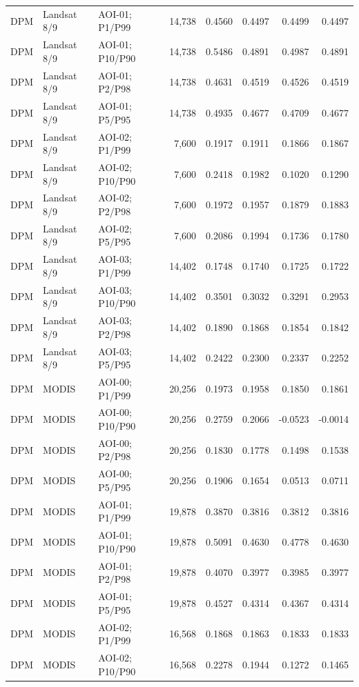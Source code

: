\begin{landscape}
\begin{longtable}{lllrrrrr}
DPM & Landsat 8/9 & AOI-01; P1/P99 & 14,738 & 0.4560 & 0.4497 & 0.4499 & 0.4497 \\
DPM & Landsat 8/9 & AOI-01; P10/P90 & 14,738 & 0.5486 & 0.4891 & 0.4987 & 0.4891 \\
DPM & Landsat 8/9 & AOI-01; P2/P98 & 14,738 & 0.4631 & 0.4519 & 0.4526 & 0.4519 \\
DPM & Landsat 8/9 & AOI-01; P5/P95 & 14,738 & 0.4935 & 0.4677 & 0.4709 & 0.4677 \\
DPM & Landsat 8/9 & AOI-02; P1/P99 & 7,600 & 0.1917 & 0.1911 & 0.1866 & 0.1867 \\
DPM & Landsat 8/9 & AOI-02; P10/P90 & 7,600 & 0.2418 & 0.1982 & 0.1020 & 0.1290 \\
DPM & Landsat 8/9 & AOI-02; P2/P98 & 7,600 & 0.1972 & 0.1957 & 0.1879 & 0.1883 \\
DPM & Landsat 8/9 & AOI-02; P5/P95 & 7,600 & 0.2086 & 0.1994 & 0.1736 & 0.1780 \\
DPM & Landsat 8/9 & AOI-03; P1/P99 & 14,402 & 0.1748 & 0.1740 & 0.1725 & 0.1722 \\
DPM & Landsat 8/9 & AOI-03; P10/P90 & 14,402 & 0.3501 & 0.3032 & 0.3291 & 0.2953 \\
DPM & Landsat 8/9 & AOI-03; P2/P98 & 14,402 & 0.1890 & 0.1868 & 0.1854 & 0.1842 \\
DPM & Landsat 8/9 & AOI-03; P5/P95 & 14,402 & 0.2422 & 0.2300 & 0.2337 & 0.2252 \\
DPM & MODIS & AOI-00; P1/P99 & 20,256 & 0.1973 & 0.1958 & 0.1850 & 0.1861 \\
DPM & MODIS & AOI-00; P10/P90 & 20,256 & 0.2759 & 0.2066 & -0.0523 & -0.0014 \\
DPM & MODIS & AOI-00; P2/P98 & 20,256 & 0.1830 & 0.1778 & 0.1498 & 0.1538 \\
DPM & MODIS & AOI-00; P5/P95 & 20,256 & 0.1906 & 0.1654 & 0.0513 & 0.0711 \\
DPM & MODIS & AOI-01; P1/P99 & 19,878 & 0.3870 & 0.3816 & 0.3812 & 0.3816 \\
DPM & MODIS & AOI-01; P10/P90 & 19,878 & 0.5091 & 0.4630 & 0.4778 & 0.4630 \\
DPM & MODIS & AOI-01; P2/P98 & 19,878 & 0.4070 & 0.3977 & 0.3985 & 0.3977 \\
DPM & MODIS & AOI-01; P5/P95 & 19,878 & 0.4527 & 0.4314 & 0.4367 & 0.4314 \\
DPM & MODIS & AOI-02; P1/P99 & 16,568 & 0.1868 & 0.1863 & 0.1833 & 0.1833 \\
DPM & MODIS & AOI-02; P10/P90 & 16,568 & 0.2278 & 0.1944 & 0.1272 & 0.1465 \\

\end{longtable}
\end{landscape}
